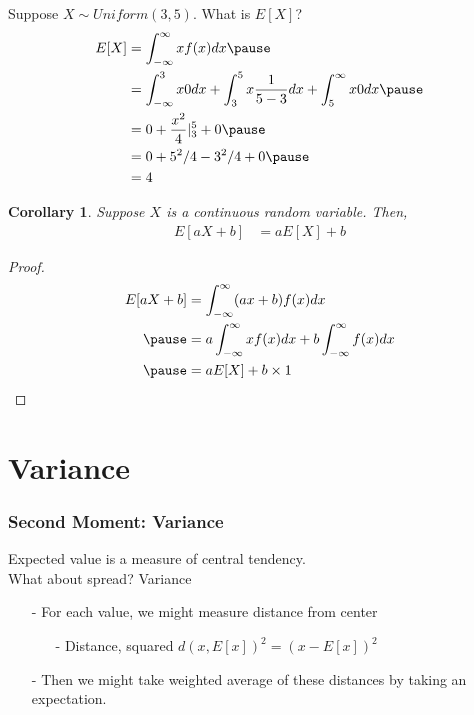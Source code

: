 \documentclass[aspectratio=169, handout]{beamer}
\newtheorem{cor}{Corollary}
\numberwithin{equation}{section}
\begin{document}
\begin{frame}
Suppose $X \sim Uniform(3,5)$.  What is $E[X]$? \pause 
\begin{align*}
E[X]  &= \int_{-\infty}^{\infty} xf(x)dx   \pause \\
&= \int_{-\infty}^{3} x 0 dx + \int_{3}^{5} x \frac{1}{5-3}dx + \int_{5}^{\infty} x 0 dx \pause  \\
&= 0 +  \frac{x^{2}}{4} |^{5}_{3} + 0   \pause \\
&= 0 + 5^2/4-3^2/4+ 0  \pause \\
&= 4 
\end{align*}


\end{frame}

\begin{frame}

\begin{cor} 
Suppose $X$ is a continuous random variable.  Then, 
\begin{align*}
E[aX + b] & =  aE[X] + b
\end{align*}
\end{cor}
\pause 

\begin{proof}
\begin{align*}
E[aX + b] & =  \int_{-\infty}^{\infty} (a x + b)f(x) dx \\ \pause 
& =  a \int_{-\infty}^{\infty} x f(x) dx + b \int_{-\infty}^{\infty} f(x)dx  \\ \pause 
& =  a E[X]  + b \times 1
\end{align*}


\end{proof}


\end{frame}





\section{Variance}

\begin{frame}
\frametitle{Second Moment: Variance} 

Expected value is a measure of \alert{central tendency}. \pause \\
What about spread? \pause  \alert{Variance}  \pause \\
\begin{itemize}
\item[-] For each value, we might measure distance from center \pause 
\begin{itemize}
\item[-] Distance, squared $d(x, E[x])^{2} = (x - E[x])^2$  \pause 
\end{itemize}
\item[-] Then we might take weighted average of these distances by taking an expectation. \pause 
\end{itemize}

\end{frame}
\end{document}
